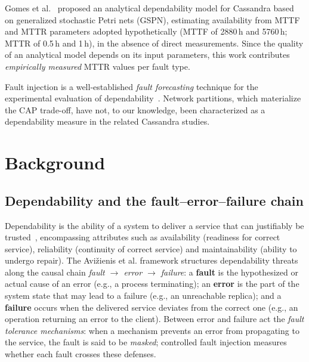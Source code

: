 \documentclass[runningheads]{llncs}
\begin{document}
Gomes et al.~\cite{gomes2019} proposed an analytical dependability model for
Cassandra based on generalized stochastic Petri nets (GSPN), estimating
availability from MTTF and MTTR parameters adopted hypothetically (MTTF of
2880\,h and 5760\,h; MTTR of 0.5\,h and 1\,h), in the absence of direct
measurements. Since the quality of an analytical model depends on its input
parameters, this work contributes \emph{empirically measured} MTTR values per
fault type.

Fault injection is a well-established \emph{fault forecasting} technique for the
experimental evaluation of
dependability~\cite{avizienis2004basic,borges2025,silva2025models}. Network
partitions, which materialize the CAP trade-off, have not, to our knowledge, been
characterized as a dependability measure in the related Cassandra studies.

\section{Background}
\label{sec:background}

\subsection{Dependability and the fault--error--failure chain}

Dependability is the ability of a system to deliver a service that can
justifiably be trusted~\cite{avizienis2004basic}, encompassing attributes such as
availability (readiness for correct service), reliability (continuity of correct
service) and maintainability (ability to undergo repair). The Avi\v{z}ienis et
al. framework structures dependability threats along the causal chain \emph{fault
$\rightarrow$ error $\rightarrow$ failure}: a \textbf{fault} is the hypothesized
or actual cause of an error (e.g., a process terminating); an \textbf{error} is
the part of the system state that may lead to a failure (e.g., an unreachable replica);
and a \textbf{failure} occurs when the delivered service deviates from the correct
one (e.g., an operation returning an error to the client). Between error and failure act the \emph{fault
tolerance mechanisms}: when a mechanism prevents an error from propagating to the
service, the fault is said to be \emph{masked}; controlled fault injection
measures whether each fault crosses these defenses.
\end{document}
